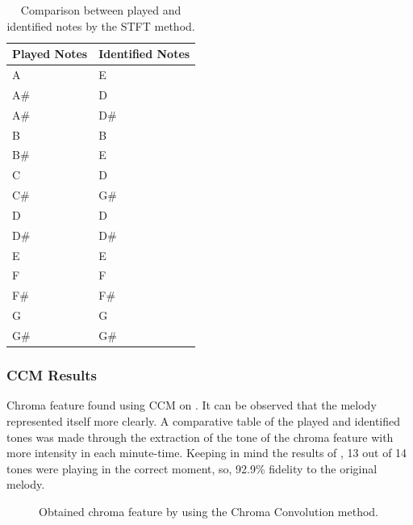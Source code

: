 \documentclass{article}
\begin{document}
	\begin{table}[h!]
	 \begin{center}
	 \begin{tabular}{|l|l|}
	  \hline
	  Played Notes & Identified Notes \\
	  \hline
	  A  & E \\
	  A\#  & D \\
	  A\#  & D\# \\
	  B  & B \\
	  B\#  & E \\
	  C  & D \\
	  C\#  & G\# \\
	  D  & D \\
	  D\#  & D\# \\
	  E  & E \\
	  F  & F \\
	  F\#  & F\# \\
	  G  & G \\
	  G\#  & G\# \\
	  \hline
	 \end{tabular}
	\end{center}
	 \caption{Comparison between played and identified notes by the STFT method.}
	 \label{tab:table-1-sfft}
	\end{table}

	


	\subsubsection{CCM Results}
	Chroma feature found using CCM on . It can be observed that the melody represented itself more clearly. A comparative table of the played and identified tones was made through the extraction of the tone of the chroma feature with more intensity in each minute-time. Keeping in mind the results of , 13 out of 14 tones were playing in the correct moment, so, 92.9\% fidelity to the original melody.
	
	\begin{figure}[h!]
	 \centerline{}
	 \caption{Obtained chroma feature by using the Chroma Convolution method.}
	 \label{fig:1-ccm}
	\end{figure}	
\end{document}
